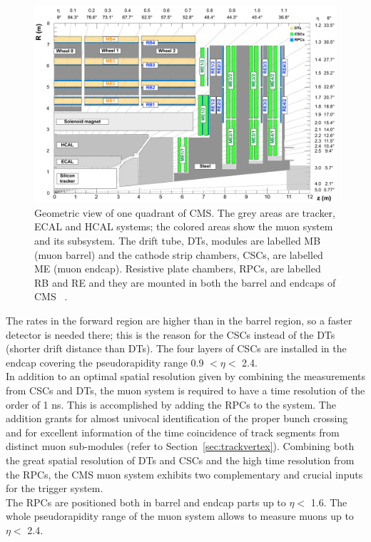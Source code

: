 \begin{figure}[h!]
\centering
\includegraphics[width=0.999\textwidth]{Figures/c2/cms_quadrant_run_ii.pdf}
\caption{Geometric view of one quadrant of CMS. The grey areas are
  tracker, ECAL and HCAL systems; the colored
  areas show the muon system and its subsystem. The drift tube, DTs,
  modules are labelled MB (muon barrel) and the cathode strip
  chambers, CSCs, are labelled ME (muon endcap). Resistive plate
  chambers, RPCs, are labelled RB and RE and they are mounted in both the barrel and endcaps of CMS
~\cite{muonsystemPU}. }
\label{fig:muonsystem}
\end{figure} 

The rates in the forward region are higher than in the
barrel region, so a faster detector is needed there; this is the
reason for the CSCs instead of the DTs (shorter drift distance than DTs).
The four layers of
CSCs are installed in the endcap covering the pseudorapidity range 0.9
$<\eta<$ 2.4. \\
In addition to an optimal spatial resolution given by combining the
measurements from CSCs and DTs, the muon system is required to have a time resolution of
the order of 1 ns. This is accomplished by adding the RPCs to the
system. The addition grants for almost univocal identification of the proper bunch
crossing and for excellent information of the time coincidence of track
segments from distinct
muon sub-modules (refer to Section~\ref{sec:trackvertex}). 
Combining both the great spatial resolution of DTs and CSCs and the
high time resolution from the RPCs,
 the CMS muon system exhibits two
complementary and crucial inputs for the trigger system. \\
The RPCs are positioned both in barrel
and endcap parts up to $\eta<$ 1.6. The whole pseudorapidity range of
the muon system allows to measure muons up to $\eta<$ 2.4.

